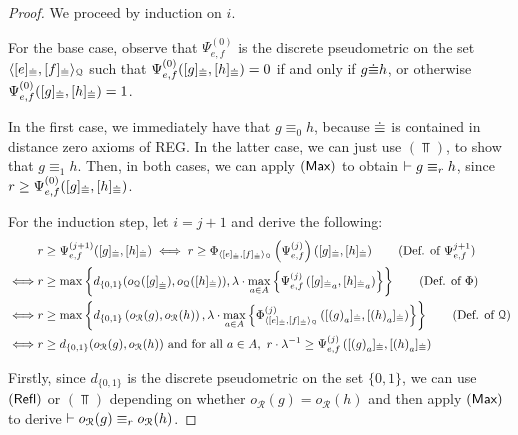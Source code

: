 \begin{proof}

We proceed by induction on $i$. 

For the base case, observe that ${\Psi}_{e,f}^{(0)}$ is the discrete pseudometric on the set $\langle [e]_{{\mathrel{\dot\equiv}}},[f]_{{\mathrel{\dot\equiv}}} \rangle_{\mathcal{Q}}$ such that ${\Psi}_{e,f}^{(0)}([g]_{{\mathrel{\dot\equiv}}}, [h]_{{\mathrel{\dot\equiv}}})=0$ if and only if ${{g} {\mathrel{\dot\equiv}} {h}}$, or otherwise ${\Psi}_{e,f}^{(0)}([g]_{{\mathrel{\dot\equiv}}}, [h]_{{\mathrel{\dot\equiv}}})=1$. 

In the first case, we immediately have that $g \equiv_0 h$, because ${\mathrel{\dot\equiv}}$ is contained in distance zero axioms of \textsf{REG}. In the latter case, we can just use $(\Top)$, to show that $g \equiv_1 h $. Then, in both cases, we can apply $(\textsf{Max})$ to obtain $\vdash g \equiv_{r} h$, since $r \geq {\Psi}_{e,f}^{(0)}([g]_{{\mathrel{\dot\equiv}}}, [h]_{{\mathrel{\dot\equiv}}})$.
	
For the induction step, let $i = j + 1$ and derive the following:
\begin{align*}
    &\e \geq {\Psi}_{e,f}^{(j + 1)}([g]_{\acirel}, [h]_{\acirel})
    \iff \e \geq \Phi_{\gen{[e]_{\acirel},[f]_{\acirel}}{\mathcal{Q}}} \left( {\Psi}_{e,f}^{(j)} \right)\left([g]_{\acirel}, [h]_{\acirel}\right) \tag{Def. of ${\Psi}_{e,f}^{j+1}$}\\
    \iff &\e \geq \max\left\{ d_{\{0,1\}} (o_{\mathcal{Q}}({[g]}_{\acirel}), o_{\mathcal{Q}}([h]_{\acirel})), \lambda \cdot \max_{a \in \alphabet} \left\{ {\Psi}_{e,f}^{(j)}\left({[g]_{\acirel}}_a, {[h]_{\acirel}}_{a}\right) \right\}\right\} \tag{Def. of $\Phi$}\\
    \iff &\e \geq \max\left\{ d_{\{0,1\}} \left(o_{\mathcal{R}}(g), o_{\mathcal{R}}(h)\right), \lambda \cdot \max_{a \in \alphabet} \left\{ \Phi_{\gen{[e]_{\acirel},[f]_{\acirel}}{\mathcal{Q}}}^{(j)}\left({[{(g)}_{a}]_{\acirel}}, {[{(h)}_{a}]_{\acirel}}\right) \right\}\right\} \tag{Def. of $\mathcal{Q}$}\\
    \iff &{\e \geq d_{\{0,1\}} (o_{\mathcal{R}}(g), o_{\mathcal{R}}(h))} \text{ and for all $a \in \alphabet$},~\e \cdot \lambda^{-1} \geq {\Psi}_{e,f}^{(j)}\left({[{(g)}_{a}]_{\acirel}}, {[{(h)}_{a}]_{\acirel}}\right)
\end{align*}

Firstly, since $d_{\{0,1\}}$ is the discrete pseudometric on the set $\{0,1\}$, we can use $(\textsf{Refl})$ or $(\Top)$ depending on whether $o_{\mathcal{R}}(g) = o_{\mathcal{R}}(h)$ and then apply $(\textsf{Max})$ to derive $\vdash o_{\mathcal{R}}(g) \equiv_r o_{\mathcal{R}}(h)$. 


\end{proof}
